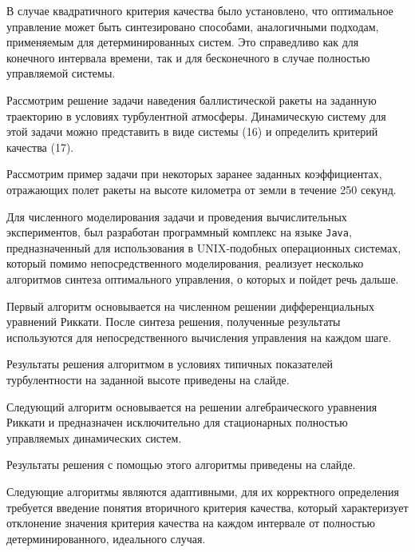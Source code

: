 \documentclass[12pt,a4paper,legalpaper,pdftex]{letter}
\begin{document}
В случае квадратичного критерия качества было установлено, что оптимальное управление может быть синтезировано способами, аналогичными подходам, применяемым для детерминированных систем. Это справедливо как для конечного интервала времени, так и для бесконечного в случае полностью управляемой системы.



Рассмотрим решение задачи наведения баллистической ракеты на заданную траекторию в условиях турбулентной атмосферы. Динамическую систему для этой задачи можно представить в виде системы (16) и определить критерий качества (17).



Рассмотрим пример задачи при некоторых заранее заданных коэффициентах, отражающих полет ракеты на высоте километра от земли в течение 250 секунд.



Для численного моделирования задачи и проведения вычислительных экспериментов, был разработан программный комплекс на языке \texttt{Java}, предназначенный для использования в UNIX-подобных операционных системах, который помимо непосредственного моделирования, реализует несколько алгоритмов синтеза оптимального управления, о которых и пойдет речь дальше.



Первый алгоритм основывается на численном решении дифференциальных уравнений Риккати. После синтеза решения, полученные результаты используются для непосредственного вычисления управления на каждом шаге.



Результаты решения алгоритмом в условиях типичных показателей турбулентности на заданной высоте приведены на слайде.



Следующий алгоритм основывается на решении алгебраического уравнения Риккати и предназначен исключительно для стационарных полностью управляемых динамических систем.



\newpage



Результаты решения с помощью этого алгоритмы приведены на слайде.



Следующие алгоритмы являются адаптивными, для их корректного определения требуется введение понятия вторичного критерия качества, который характеризует отклонение значения критерия качества на каждом интервале от полностью детерминированного, идеального случая.
\end{document}
